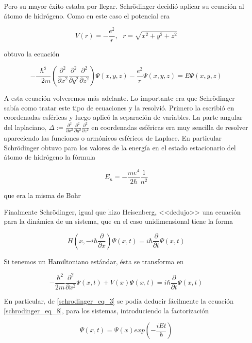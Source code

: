 Pero su mayor \'exito estaba por llegar. Schr\"odinger decidi\'o aplicar su ecuaci\'on al \'atomo de
hidr\'ogeno. Como en este caso el potencial era

\begin{equation*}
	V(r)=-\frac{e^{2}}{r}, \ \ \ 
	r=\sqrt{x^2+y^2+z^2}
\end{equation*}

obtuvo la ecuaci\'on

\begin{equation}
	-\frac{\hbar^2}{-2m}
	\left( \frac{\partial^2}{\partial x^2} \frac{\partial^2}{\partial y^2} \frac{\partial^2}{\partial z^2} \right)
	\Psi(x,y,z)-\frac{e^{2}}{r} \Psi(x,y,z)= E \Psi(x,y,z)
	\label{schrodinger_eq_8}
\end{equation}

A esta ecuaci\'on volveremos m\'as adelante. Lo importante era que Schr\"odinger sab\'ia como tratar
este tipo de ecuaciones y la resolvi\'o. Primero la escribi\'o en coordenadas esf\'ericas y luego aplic\'o la
separaci\'on de variables. La parte angular del laplaciano, $ \Delta := \frac{\partial^2}{\partial x^2} \frac{\partial^2}{\partial y^2} \frac{\partial^2}{\partial z^2} $ en coordenadas
esf\'ericas era muy sencilla de resolver apareciendo las funciones o arm\'onicos esf\'ericos de Laplace.
En particular Schr\"odinger obtuvo para los valores de la energ\'ia en el estado estacionario del
\'atomo de hidr\'ogeno la f\'ormula

\begin{equation*}
	E_n = -\frac{me^4}{2\hbar}\frac{1}{n^2}
\end{equation*}

que era la misma de Bohr

Finalmente Schr\"odinger, igual que hizo Heisenberg, <<dedujo>> una ecuaci\'on para la din\'amica
de un sistema, que en el caso unidimensional tiene la forma

\begin{equation*}
	H \left( x,-i \hbar \frac{\partial}{\partial x} \right) \Psi(x,t) =
	i\hbar \frac{\partial}{\partial t} \Psi(x,t)
\end{equation*}

Si tenemos un Hamiltoniano est\'andar, \'esta se transforma en

\begin{equation*}
	-\frac{\hbar^2}{2m} \frac{\partial^2}{\partial x^2} \Psi(x,t) + V(x) \Psi(x,t)=
	i\hbar \frac{\partial}{\partial t} \Psi(x,t)
\end{equation*}

En particular, de \ref{schrodinger_eq_3} se pod\'ia deducir f\'acilmente la ecuaci\'on 
\ref{schrodinger_eq_8}, para los sistemas, introduciendo la factorizaci\'on

\begin{equation*}
	\Psi(x,t)=\Psi(x) exp \left( -\frac{iEt}{\hbar} \right)
\end{equation*}